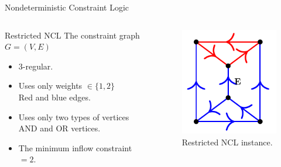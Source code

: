 \begin{frame}{Nondeterministic Constraint Logic}
  \begin{columns}
    \begin{column}{0.6\textwidth}
    \begin{block}{Restricted NCL}
    The constraint graph $G = (V, E)$
      \begin{itemize}
        \item $3$-regular.
        \item Uses only weights $\in \{1,2\}$ \\ 
        Red and blue edges.
        \item Uses only two types of vertices \\ 
        AND and OR vertices. 
        \item The minimum inflow constraint $ = 2$.
      \end{itemize}
   \end{block}
   \end{column}
   
   \begin{column}{0.4\textwidth}
       \begin{figure}
            \centering
            \includegraphics[scale=0.3]{img/restricted_ncl_1.png}
            \caption{Restricted NCL instance.}
            \label{fig:ps}
        \end{figure}
   \end{column}
   
\end{columns}   
\end{frame}

